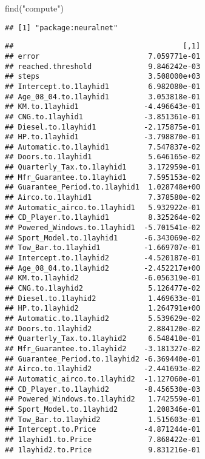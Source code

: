 \documentclass[
]{article}
\newenvironment{Shaded}{\begin{snugshade}}{\end{snugshade}}
\newcommand{\FunctionTok}[1]{\textcolor[rgb]{0.00,0.00,0.00}{#1}}
\newcommand{\NormalTok}[1]{#1}
\newcommand{\OtherTok}[1]{\textcolor[rgb]{0.56,0.35,0.01}{#1}}
\newcommand{\SpecialCharTok}[1]{\textcolor[rgb]{0.00,0.00,0.00}{#1}}
\newcommand{\StringTok}[1]{\textcolor[rgb]{0.31,0.60,0.02}{#1}}
\begin{document}
\begin{Shaded}
\begin{Highlighting}[]
\FunctionTok{find}\NormalTok{(}\StringTok{"compute"}\NormalTok{)}
\end{Highlighting}
\end{Shaded}

\begin{verbatim}
## [1] "package:neuralnet"
\end{verbatim}

\begin{Shaded}
\end{Shaded}

\begin{verbatim}
##                                       [,1]
## error                         7.059771e-01
## reached.threshold             9.846242e-03
## steps                         3.508000e+03
## Intercept.to.1layhid1         6.982080e-01
## Age_08_04.to.1layhid1         3.053818e-01
## KM.to.1layhid1               -4.496643e-01
## CNG.to.1layhid1              -3.851361e-01
## Diesel.to.1layhid1           -2.175875e-01
## HP.to.1layhid1               -3.798870e-01
## Automatic.to.1layhid1         7.547837e-02
## Doors.to.1layhid1             5.646165e-02
## Quarterly_Tax.to.1layhid1     3.172959e-01
## Mfr_Guarantee.to.1layhid1     7.595153e-02
## Guarantee_Period.to.1layhid1  1.028748e+00
## Airco.to.1layhid1             7.378580e-02
## Automatic_airco.to.1layhid1   5.932922e-01
## CD_Player.to.1layhid1         8.325264e-02
## Powered_Windows.to.1layhid1  -5.701541e-02
## Sport_Model.to.1layhid1      -6.343069e-02
## Tow_Bar.to.1layhid1          -1.669707e-01
## Intercept.to.1layhid2        -4.520187e-01
## Age_08_04.to.1layhid2        -2.452217e+00
## KM.to.1layhid2               -6.056319e-01
## CNG.to.1layhid2               5.126477e-02
## Diesel.to.1layhid2            1.469633e-01
## HP.to.1layhid2                1.264791e+00
## Automatic.to.1layhid2         5.539629e-02
## Doors.to.1layhid2             2.884120e-02
## Quarterly_Tax.to.1layhid2     6.548410e-01
## Mfr_Guarantee.to.1layhid2    -3.181327e-02
## Guarantee_Period.to.1layhid2 -6.369440e-01
## Airco.to.1layhid2            -2.441693e-02
## Automatic_airco.to.1layhid2  -1.127060e-01
## CD_Player.to.1layhid2        -8.456530e-03
## Powered_Windows.to.1layhid2   1.742559e-01
## Sport_Model.to.1layhid2       1.208346e-01
## Tow_Bar.to.1layhid2           1.515603e-01
## Intercept.to.Price           -4.871244e-01
## 1layhid1.to.Price             7.868422e-01
## 1layhid2.to.Price             9.831216e-01
\end{verbatim}
\end{document}
